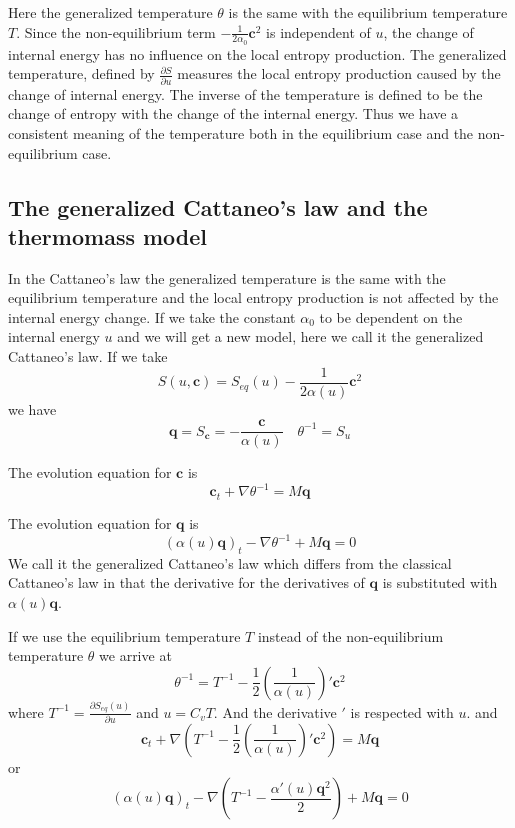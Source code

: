 \documentclass[a4paper]{article}
\begin{document}
Here the generalized temperature $\theta$ is the same with the equilibrium temperature $T$. Since the non-equilibrium term $-\frac{1}{2\alpha_0}\mathbf{c}^2$ is independent of $u$, the change of internal energy has no influence on the local entropy production. The generalized temperature, defined by $\frac{\partial S}{\partial u}$ measures the local entropy production caused by the change of internal energy. The inverse of the temperature is defined to be the change of entropy with the change of the internal energy. Thus we have a consistent meaning of the temperature both in the equilibrium case and the non-equilibrium case.

\subsection{The generalized Cattaneo's law and the thermomass model}
In the Cattaneo's law the generalized temperature is the same with the equilibrium temperature and the local entropy production is not affected by the internal energy change. If we take the constant $\alpha_0$ to be dependent on the internal energy $u$ and we will get a new model, here we call it the generalized Cattaneo's law.
If we take
\begin{equation}
S(u,\mathbf{c})=S_{eq}(u)-\frac{1}{2\alpha(u)} \mathbf{c}^2
\end{equation}
we have 
\begin{equation}
\mathbf{q} = S_{\mathbf{c}}=-\frac{ \mathbf{c}}{\alpha(u)} \quad \theta^{-1}=S_u
\end{equation}

The evolution equation for $\mathbf{c}$ is 
\begin{equation}
\mathbf{c}_t+\nabla \theta^{-1}=M \mathbf{q}
\end{equation}

The evolution equation for $\mathbf{q}$ is
\begin{equation}\label{eq_theta}
({\alpha(u)}\mathbf{q})_t-\nabla \theta^{-1}+M\mathbf{q}=0
\end{equation}
We call it the generalized Cattaneo's law which differs from the classical Cattaneo's law in that the derivative for the derivatives of $\mathbf{q}$ is substituted with ${\alpha(u)}\mathbf{q}$.

If we use the equilibrium temperature $T$ instead of the non-equilibrium temperature $\theta$ we arrive at
\begin{equation}
\theta^{-1}=T^{-1}-\frac{1}{2}(\frac{1}{\alpha(u)})'\mathbf{c}^2
\end{equation}
where $T^{-1}=\frac{\partial S_{eq}(u)}{\partial u}$ and $u=C_v T$. And the derivative $'$ is respected with $u$.
and
\begin{equation}
\mathbf{c}_t+\nabla(T^{-1}-\frac{1}{2}(\frac{1}{\alpha(u)})' \mathbf{c}^2)=M\mathbf{q}
\end{equation}
or
\begin{equation}\label{eq_Teq}
({\alpha(u)}{\mathbf{q}})_t-\nabla(T^{-1}- \frac{\alpha'(u)\mathbf{q}^2}{2})+M\mathbf{q}=0
\end{equation}
\end{document}
